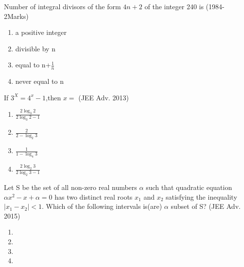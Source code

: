 \iffalse
  \title{Assignment}
  \author{Ai24BTECH11024-Pappuri Prahladha}
  \section{mcq-multiple}
\fi


    \item Number of integral divisors of the form $4n+2$ of the integer 240 is        \hfill (1984-2Marks)
 \begin{multicols}{2}
 \begin{enumerate}
     \item a positive integer
     \item divisible by n
     \item equal to n+$\frac{1}{n}$
     \item never equal to n
 \end{enumerate}
 \end{multicols}
 \item If $3^X=4^x-1$,then $x=$ \hfill (JEE Adv. 2013)
 \begin{multicols}{2}
 \begin{enumerate}
     \item $\frac{2\log_3 2}{2\log_3 2-1}$
     \item $\frac{2}{2-\log_2 3}$
     \item $\frac{1}{1-\log_4 3}$
     \item $\frac{2\log_2 3}{2\log_2 3-1}$
 \end{enumerate}
 \end{multicols}
 \item Let S be the set of all non-zero real numbers \(\alpha\) such that quadratic equation $\alpha x^2-x+\alpha=0$ has two distinct real roots $x_1$ and $x_2$ satisfying the inequality$|x_1-x_2|<1$. Which of the following intervals is(are) $\alpha$ subset of S? \hfill (JEE Adv. 2015)
 \begin{multicols}{2}
 \begin{enumerate}
     \item {}
     \item {}
     \item {}
    \item {}
 \end{enumerate}
 \end{multicols}


% 
